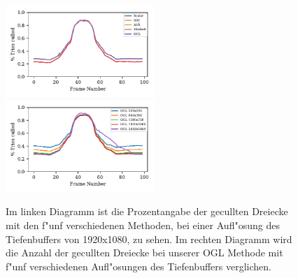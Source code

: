 \documentclass[journal]{vgtc}
\begin{document}
\begin{figure}
	\begin{minipage}{\textwidth}
		\includegraphics[width=0.5\textwidth]{images/Evaluation_1_Results_Percentage culled.pdf}
		\includegraphics[width=0.5\textwidth]{images/Evaluation_4_Results_Percentage culled.pdf}
	\end{minipage}
	\begin{minipage}{\textwidth}
		\centering
	\end{minipage}
	\caption{Im linken Diagramm ist die Prozentangabe der gecullten Dreiecke mit den f"unf verschiedenen 	Methoden, bei einer Aufl"osung des Tiefenbuffers von 1920x1080, zu sehen.
		Im rechten Diagramm wird die Anzahl der gecullten Dreiecke bei unserer OGL Methode mit f"unf verschiedenen Aufl"osungen des Tiefenbuffers verglichen.}
	\label{fig:resolution_culled}
\end{figure}
\end{document}
